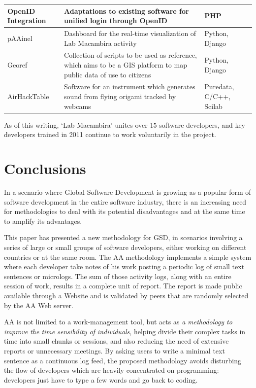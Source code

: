 \documentclass{article}
\begin{document}
\begin{table}
{\begin{tabular}{|l|p{5cm}|l|}
        \hline
        OpenID Integration & Adaptations to existing software for
        unified login through OpenID & PHP \\
        \hline
        pAAinel & Dashboard for the real-time visualization of Lab
        Macambira activity & Python, Django \\
        \hline
        Georef & Collection of scripts to be used as reference, which
        aims to be a GIS platform to map public data of use to
        citizens & Python, Django \\
        \hline
        AirHackTable & Software for an instrument which generates
        sound from flying origami tracked by webcams & Puredata,
        C/C++, Scilab \\
        \hline
        \end{tabular}}
    \label{tabela:criados}
\end{table}

As of this writing, `Lab Macambira' unites over 15 software developers, and 
key developers trained in 2011 continue to work voluntarily in the project.

\section{Conclusions}
\label{conclusions}

In a scenario where Global Software Development is growing as a popular form of
software development in the entire software industry, there is an increasing
need for methodologies to deal with its potential disadvantages and at the same
time to amplify its advantages.

This paper has presented a new methodology for GSD, in scenarios
involving a series of large or small groups of software developers, either working on
different countries or at the same room. The AA methodology
implements a simple system where each developer take notes of his work
posting a periodic log of small text sentences or micrologs. The sum of those
activity logs, along with an entire session of work, results in a complete
unit of report. The report is made public available through a Website and is
validated by peers that are randomly selected by the AA Web server.

AA is not limited to a work-management tool, but acts as \emph{a
methodology to improve the time sensibility of individuals}, helping divide their
complex tasks in time into small chunks or sessions, and also reducing the need
of extensive reports or unnecessary meetings. By asking users to write a minimal
text sentence as a continuous log feed, the proposed methodology avoids
disturbing the flow of developers which are heavily concentrated on programming:
developers just have to type a few words and go back to coding.
\end{document}
